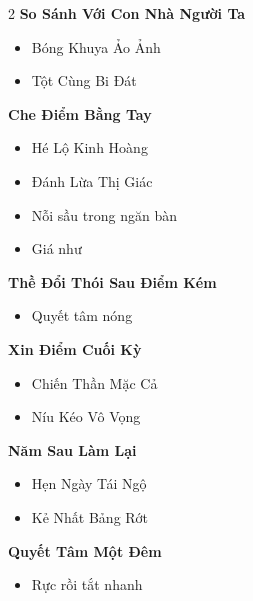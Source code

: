 \begin{multicols}{2}
\vspace{0.8em}
\textbf{\color{chapterline}So Sánh Với Con Nhà Người Ta}
\begin{itemize}[leftmargin=1.2em, itemsep=0.1em, label=\textcolor{titlecolor}{\tiny$\blacksquare$}]
  \item Bóng Khuya Ảo Ảnh
  \item Tột Cùng Bi Đát
\end{itemize}
\vspace{0.8em}
\textbf{\color{chapterline}Che Điểm Bằng Tay}
\begin{itemize}[leftmargin=1.2em, itemsep=0.1em, label=\textcolor{titlecolor}{\tiny$\blacksquare$}]
  \item Hé Lộ Kinh Hoàng
  \item Đánh Lừa Thị Giác
  \item Nỗi sầu trong ngăn bàn
  \item Giá như
\end{itemize}
\vspace{0.8em}
\textbf{\color{chapterline}Thề Đổi Thói Sau Điểm Kém}
\begin{itemize}[leftmargin=1.2em, itemsep=0.1em, label=\textcolor{titlecolor}{\tiny$\blacksquare$}]
  \item Quyết tâm nóng
\end{itemize}
\vspace{0.8em}
\textbf{\color{chapterline}Xin Điểm Cuối Kỳ}
\begin{itemize}[leftmargin=1.2em, itemsep=0.1em, label=\textcolor{titlecolor}{\tiny$\blacksquare$}]
  \item Chiến Thần Mặc Cả
  \item Níu Kéo Vô Vọng
\end{itemize}
\vspace{0.8em}
\textbf{\color{chapterline}Năm Sau Làm Lại}
\begin{itemize}[leftmargin=1.2em, itemsep=0.1em, label=\textcolor{titlecolor}{\tiny$\blacksquare$}]
  \item Hẹn Ngày Tái Ngộ
  \item Kẻ Nhất Bảng Rớt
\end{itemize}
\vspace{0.8em}
\textbf{\color{chapterline}Quyết Tâm Một Đêm}
\begin{itemize}[leftmargin=1.2em, itemsep=0.1em, label=\textcolor{titlecolor}{\tiny$\blacksquare$}]
  \item Rực rồi tắt nhanh
\end{itemize}
\vspace{0.8em}
\end{multicols}
